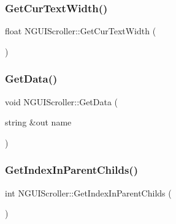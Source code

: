 \hypertarget{class_n_g_u_i_scroller_a1e1726960f5dada0d73dbe4f7e4d5bc2}{}\label{class_n_g_u_i_scroller_a1e1726960f5dada0d73dbe4f7e4d5bc2} 
\subsubsection{\texorpdfstring{Get\+Cur\+Text\+Width()}{GetCurTextWidth()}}
{\footnotesize\ttfamily float N\+G\+U\+I\+Scroller\+::\+Get\+Cur\+Text\+Width (\begin{DoxyParamCaption}{ }\end{DoxyParamCaption})}

\hypertarget{class_n_g_u_i_scroller_a90933bab31a1cc2701b7f236ebb0c026}{}\label{class_n_g_u_i_scroller_a90933bab31a1cc2701b7f236ebb0c026} 
\subsubsection{\texorpdfstring{Get\+Data()}{GetData()}}
{\footnotesize\ttfamily void N\+G\+U\+I\+Scroller\+::\+Get\+Data (\begin{DoxyParamCaption}\item[{string \&out}]{name }\end{DoxyParamCaption})}

\hypertarget{class_n_g_u_i_scroller_a4f283e5cb6434d88cf871857e1c38241}{}\label{class_n_g_u_i_scroller_a4f283e5cb6434d88cf871857e1c38241} 
\subsubsection{\texorpdfstring{Get\+Index\+In\+Parent\+Childs()}{GetIndexInParentChilds()}}
{\footnotesize\ttfamily int N\+G\+U\+I\+Scroller\+::\+Get\+Index\+In\+Parent\+Childs (\begin{DoxyParamCaption}{ }\end{DoxyParamCaption})}

\hypertarget{class_n_g_u_i_scroller_af8ce78fca34f1ef23a6f21d97dec14e5}{}\label{class_n_g_u_i_scroller_af8ce78fca34f1ef23a6f21d97dec14e5} 
